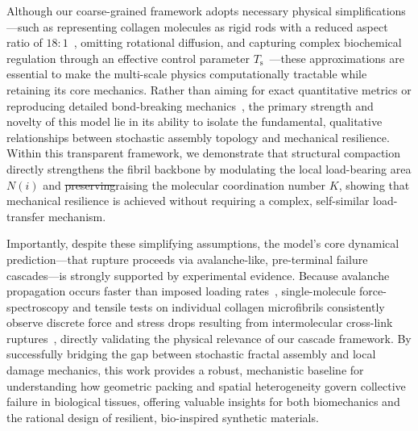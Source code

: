 \documentclass[aps,physrev,preprint,groupedaddress,linenumbers]{revtex4-2}
\newcommand{\added}[1]{{\color{red}#1}}
\newcommand{\deleted}[1]{{\color{red}\sout{#1}}}
\begin{document}
Although our coarse-grained framework adopts necessary physical simplifications—such as representing collagen molecules as rigid rods with a reduced aspect ratio of $18{:}1$~\cite{Parkinson1997,Buehler2008b}, omitting rotational diffusion, and capturing complex biochemical regulation through an effective control parameter $T_{\mathrm{s}}$~\cite{Jiang2004,Yang2009,Kalbitzer2018,Kadler1996,Canty2005,Kadler2008}—these approximations are essential to make the multi-scale physics computationally tractable while retaining its core mechanics. Rather than aiming for exact quantitative metrics or reproducing detailed bond-breaking mechanics~\cite{RuizFranco2022,Provenzano2006,Innocenti2022-lp}, the primary strength and novelty of this model lie in its ability to isolate the fundamental, qualitative relationships between stochastic assembly topology and mechanical resilience. Within this transparent framework, we demonstrate that structural compaction directly strengthens the fibril backbone by modulating the local load-bearing area $N(i)$ and \deleted{preserving}\added{raising} the molecular coordination number $K$, showing that mechanical resilience is achieved without requiring a complex, self-similar load-transfer mechanism.

Importantly, despite these simplifying assumptions, the model's core dynamical prediction—that rupture proceeds via avalanche-like, pre-terminal failure cascades—is strongly supported by experimental evidence. Because avalanche propagation occurs faster than imposed loading rates~\cite{Noguchi2024}, single-molecule force-spectroscopy and tensile tests on individual collagen microfibrils consistently observe discrete force and stress drops resulting from intermolecular cross-link ruptures~\cite{Gutsmann2004,Svensson2013,Deng2024}, directly validating the physical relevance of our cascade framework. By successfully bridging the gap between stochastic fractal assembly and local damage mechanics, this work provides a robust, mechanistic baseline for understanding how geometric packing and spatial heterogeneity govern collective failure in biological tissues, offering valuable insights for both biomechanics and the rational design of resilient, bio-inspired synthetic materials.
\end{document}
